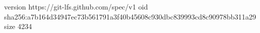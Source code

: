 version https://git-lfs.github.com/spec/v1
oid sha256:a7b164d34947ec73b561791a3f40b45608c930dbc839993cd8c90978bb311a29
size 4234
